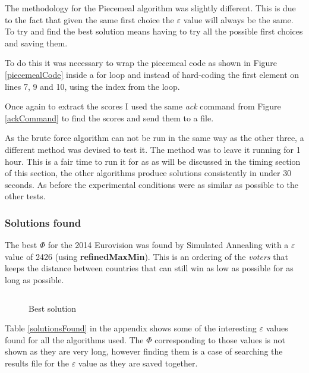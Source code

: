 \documentclass[12pt]{report}
\begin{document}

The methodology for the Piecemeal algorithm was slightly different. This is due to the fact that given the same first choice the $\varepsilon$ value will always be the same. To try and find the best solution means having to try all the possible first choices and saving them.

To do this it was necessary to wrap the piecemeal code as shown in Figure \ref{piecemealCode} inside a for loop and instead of hard-coding the first element on lines 7, 9 and 10, using the index from the loop.

Once again to extract the scores I used the same \textit{ack} command from Figure \ref{ackCommand} to find the scores and send them to a file.

As the brute force algorithm can not be run in the same way as the other three, a different method was devised to test it. The method was to leave it running for 1 hour. This is a fair time to run it for as as will be discussed in the timing section of this section, the other algorithms produce solutions consistently in under 30 seconds. As before the experimental conditions were as similar as possible to the other tests.


\subsubsection{Solutions found}
The best $\Phi$ for the 2014 Eurovision was found by Simulated Annealing with a $\varepsilon$ value of 2426 (using \textbf{refinedMaxMin}). This is an ordering of the \textit{voters} that keeps the distance between countries that can still win as low as possible for as long as possible.

\begin{figure}[H]
\caption{Best solution}
\label{bestSolution}
\begin{verbatim}

\end{verbatim}
\end{figure}

Table \ref{solutionsFound} in the appendix shows some of the interesting $\varepsilon$ values found for all the algorithms used. The $\Phi$ corresponding to those values is not shown as they are very long, however finding them is a case of searching the results file for the $\varepsilon$ value as they are saved together.
\end{document}
